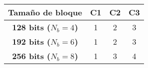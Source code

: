 \begin{tabular}{|c|c|c|c|}
  \hline
  \textbf{Tamaño de bloque} & \textbf{C1} & \textbf{C2} & \textbf{C3} \\ \hline
  \textbf{128 bits ($N_b = 4$)} & 1 & 2 & 3 \\ \hline
  \textbf{192 bits ($N_b = 6$)} & 1 & 2 & 3 \\ \hline
  \textbf{256 bits ($N_b = 8$)} & 1 & 3 & 4 \\ \hline
\end{tabular}